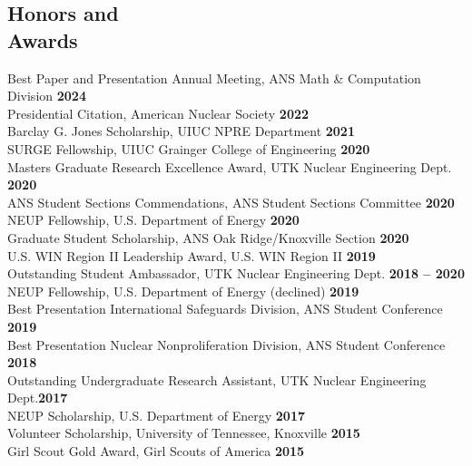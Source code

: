 \documentclass[margin,line]{resume}
\begin{document}
\begin{resume}
    \section{\mysidestyle Honors and\\Awards}
        Best Paper and Presentation Annual Meeting, ANS Math \& Computation Division \hfill \textbf{2024}\vspace{0.5mm}\\
        Presidential Citation, American Nuclear Society \hfill \textbf{2022}\vspace{.5mm}\\
        Barclay G. Jones Scholarship, UIUC NPRE Department \hfill \textbf{2021}\vspace{0.5mm}\\
        SURGE Fellowship, UIUC Grainger College of Engineering \hfill \textbf{2020}\vspace{0.5mm}\\
        Masters Graduate Research Excellence Award, UTK Nuclear Engineering Dept. \hfill \textbf{2020}\vspace{.5mm}\\%
        ANS Student Sections Commendations, ANS Student Sections Committee \hfill \textbf{2020}\vspace{.5mm}\\%
        NEUP Fellowship, U.S. Department of Energy \hfill \textbf{2020}\vspace{0.5mm}\\
        Graduate Student Scholarship, ANS Oak Ridge/Knoxville Section \hfill \textbf{2020}\vspace{0.5mm}\\
        U.S. WIN Region II Leadership Award, U.S. WIN Region II \hfill \textbf{2019}\vspace{.5mm}\\%
        Outstanding Student Ambassador, UTK Nuclear Engineering Dept. \hfill \textbf{2018 -- 2020}\vspace{.5mm}\\%
        NEUP Fellowship, U.S. Department of Energy (declined) \hfill \textbf{2019}\vspace{0.5mm}\\
        Best Presentation International Safeguards Division, ANS Student Conference \hfill \textbf{2019}\vspace{0.5mm}\\%
        Best Presentation Nuclear Nonproliferation Division, ANS Student Conference \hfill \textbf{2018}\vspace{0.5mm}\\%
        Outstanding Undergraduate Research Assistant, UTK Nuclear Engineering Dept.\hfill \textbf{2017}\vspace{.5mm}\\%
        NEUP Scholarship, U.S. Department of Energy \hfill \textbf{2017}\vspace{0.5mm}\\
        Volunteer Scholarship, University of Tennessee, Knoxville \hfill \textbf{2015}\vspace{0.5mm}\\
        Girl Scout Gold Award, Girl Scouts of America \hfill \textbf{2015}


\end{resume}
\end{document}
